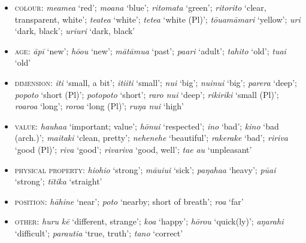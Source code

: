 \begin{itemize}
\item 
\textsc{colour}: \textit{meamea} ‘red’; \textit{moana} ‘blue’; \textit{ritomata} ‘green’; \textit{ritorito} ‘clear, transparent, white’; \textit{teatea} ‘white’; \textit{tetea} ‘white (Pl)’; \textit{tōuamāmari} ‘yellow’; \textit{{\ꞌ}uri} ‘dark, black’; \textit{{\ꞌ}uri{\ꞌ}uri} ‘dark, black’

\item 
\textsc{age}: \textit{{\ꞌ}āpī} ‘new’; \textit{hō{\ꞌ}ou} ‘new’; \textit{mātāmu{\ꞌ}a} ‘past’; \textit{pa{\ꞌ}ari} ‘adult’; \textit{tahito} ‘old’; \textit{tuai} ‘old’

\item 
\textsc{dimension}: \textit{{\ꞌ}iti} ‘small, a bit’; \textit{{\ꞌ}iti{\ꞌ}iti} ‘small’; \textit{nui} ‘big’; \textit{nuinui} ‘big’; \textit{parera} ‘deep’; \textit{popoto} ‘short (Pl)’; \textit{potopoto} ‘short’; \textit{raro nui} ‘deep’; \textit{rikiriki} ‘small (Pl)’; \textit{roaroa} ‘long’; \textit{roroa} ‘long (Pl)’; \textit{ruŋa nui} ‘high’

\item 
\textsc{value}: \textit{hauha{\ꞌ}a} ‘important; value’; \textit{hōnui} ‘respected’; \textit{{\ꞌ}ino} ‘bad’; \textit{kino} ‘bad (arch.)’; \textit{ma{\ꞌ}itaki} ‘clean, pretty’; \textit{nehenehe} ‘beautiful’; \textit{rakerake} ‘bad’; \textit{ririva} ‘good (Pl)’; \textit{riva} ‘good’; \textit{rivariva} ‘good, well’; \textit{ta{\ꞌ}e} \textit{au} ‘unpleasant’

\item 
\textsc{physical property}: \textit{hiohio} ‘strong’; \textit{māuiui} ‘sick’; \textit{paŋaha{\ꞌ}a} ‘heavy’; \textit{pūai} ‘strong’; \textit{tītika} ‘straight’

\item 
\textsc{position}: \textit{hāhine} ‘near’; \textit{poto} ‘nearby; short of breath’; \textit{roa} ‘far’

\item 
\textsc{other}: \textit{huru} \textit{kē} ‘different, strange’; \textit{koa} ‘happy’; \textit{hōrou} ‘quick(ly)’; \textit{aŋarahi} ‘difficult’; \textit{parauti{\ꞌ}a} ‘true, truth’; \textit{tano} ‘correct’

\end{itemize}

